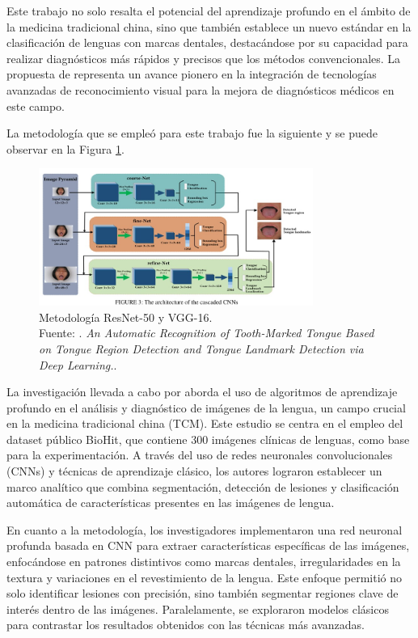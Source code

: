 Este trabajo no solo resalta el potencial del aprendizaje profundo en el ámbito de la medicina tradicional china, sino que también establece un nuevo estándar en la clasificación de lenguas con marcas dentales, destacándose por su capacidad para realizar diagnósticos más rápidos y precisos que los métodos convencionales. La propuesta de \cite{Tang2020} representa un avance pionero en la integración de tecnologías avanzadas de reconocimiento visual para la mejora de diagnósticos médicos en este campo.

La metodología que se empleó para este trabajo fue la siguiente y se puede observar en la Figura \ref{2:fig124}.

\begin{figure}[H]
	\begin{center}
		\includegraphics[width=0.80\textwidth]{2/figures/2.jpeg}
		\caption[Metodología ResNet-50 y VGG-16]{Metodología ResNet-50 y VGG-16. \\
		Fuente: \cite{Tang2020}. \textit{An Automatic Recognition of Tooth-Marked Tongue Based on Tongue Region Detection and Tongue Landmark Detection via Deep Learning.}.}
		\label{2:fig124}
	\end{center}
\end{figure}

La investigación llevada a cabo por \cite{Jiatuo2024} aborda el uso de algoritmos de aprendizaje profundo en el análisis y diagnóstico de imágenes de la lengua, un campo crucial en la medicina tradicional china (TCM). Este estudio se centra en el empleo del dataset público BioHit, que contiene 300 imágenes clínicas de lenguas, como base para la experimentación. A través del uso de redes neuronales convolucionales (CNNs) y técnicas de aprendizaje clásico, los autores lograron establecer un marco analítico que combina segmentación, detección de lesiones y clasificación automática de características presentes en las imágenes de lengua.  

En cuanto a la metodología, los investigadores implementaron una red neuronal profunda basada en CNN para extraer características específicas de las imágenes, enfocándose en patrones distintivos como marcas dentales, irregularidades en la textura y variaciones en el revestimiento de la lengua. Este enfoque permitió no solo identificar lesiones con precisión, sino también segmentar regiones clave de interés dentro de las imágenes. Paralelamente, se exploraron modelos clásicos para contrastar los resultados obtenidos con las técnicas más avanzadas.

